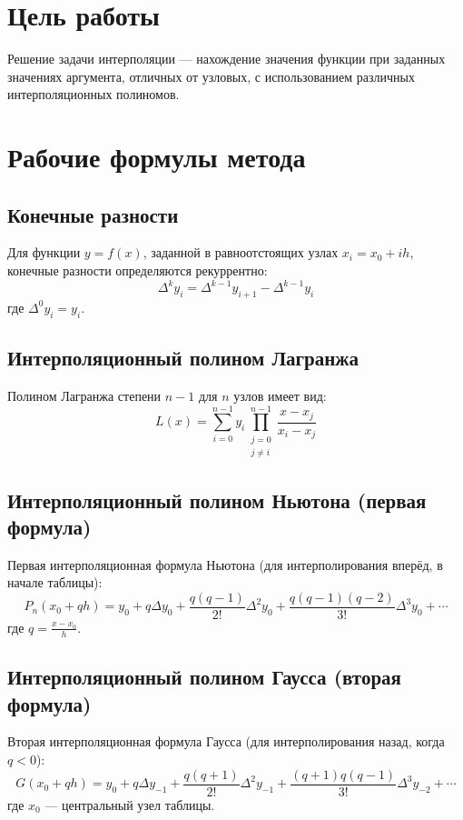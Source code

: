 \section{Цель работы}

Решение задачи интерполяции — нахождение значения функции при заданных значениях аргумента, отличных от узловых, с использованием различных интерполяционных полиномов.

\section{Рабочие формулы метода}

\subsection{Конечные разности}

Для функции $y=f(x)$, заданной в равноотстоящих узлах $x_i = x_0 + ih$, конечные разности определяются рекуррентно:
\[
\Delta^k y_i = \Delta^{k-1} y_{i+1} - \Delta^{k-1} y_i
\]
где $\Delta^0 y_i = y_i$.

\subsection{Интерполяционный полином Лагранжа}

Полином Лагранжа степени $n-1$ для $n$ узлов имеет вид:
\[
L(x) = \sum_{i=0}^{n-1} y_i \prod_{\substack{j=0 \\ j \neq i}}^{n-1} \frac{x - x_j}{x_i - x_j}
\]

\subsection{Интерполяционный полином Ньютона (первая формула)}

Первая интерполяционная формула Ньютона (для интерполирования вперёд, в начале таблицы):
\[
P_n(x_0 + qh) = y_0 + q\Delta y_0 + \frac{q(q-1)}{2!}\Delta^2 y_0 + \frac{q(q-1)(q-2)}{3!}\Delta^3 y_0 + \cdots
\]
где $q = \frac{x - x_0}{h}$.

\subsection{Интерполяционный полином Гаусса (вторая формула)}

Вторая интерполяционная формула Гаусса (для интерполирования назад, когда $q<0$):
\[
G(x_0 + qh) = y_0 + q\Delta y_{-1} + \frac{q(q+1)}{2!}\Delta^2 y_{-1} + \frac{(q+1)q(q-1)}{3!}\Delta^3 y_{-2} + \cdots
\]
где $x_0$ — центральный узел таблицы.

